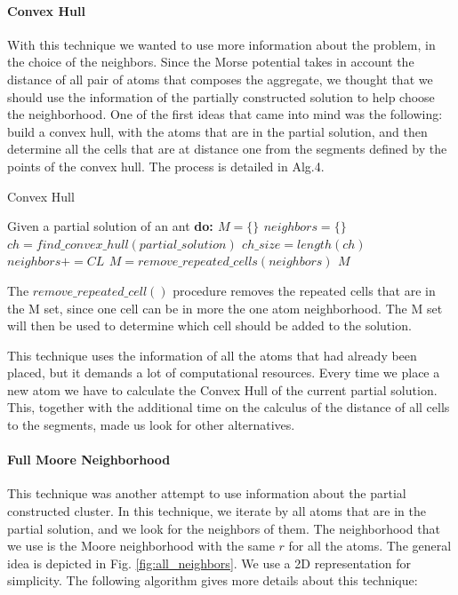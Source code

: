 			\paragraph*{Convex Hull}
			With this technique we wanted to use more information about the problem, in the choice of the neighbors. Since the Morse potential takes in account the distance of all pair of atoms that composes the aggregate, we thought that we should use the information of the partially constructed solution to help choose the neighborhood. One of the first ideas that came into mind was the following: build a convex hull, with the atoms that are in the partial solution, and then determine all the cells that are at distance one from the segments defined by the points of the convex hull. The process is detailed in Alg.4.
			\begin{algorithm}
				\caption{Convex Hull}
				\label{alg:convex_hull}
				\begin{algorithmic}
				\STATE Given a partial solution of an ant \bf{do}:
				\STATE $M = \{\}$
				\STATE $neighbors = \{\}$
				\STATE $ch = find\_convex\_hull(partial\_solution)$
				\STATE $ch\_size = length(ch)$
							\STATE $neighbors += CL$
						\ENDIF
					\ENDFOR
				\ENDFOR
				\STATE $M = remove\_repeated\_cells(neighbors)$
				\RETURN $M$
				\end{algorithmic}
			\end{algorithm}
			
			The $remove\_repeated\_cell()$ procedure removes the repeated cells that are in the M set, since one cell can be in more the one atom neighborhood.
			The M set will then be used to determine which cell should be added to the solution.

			This technique uses the information of all the atoms that had already been placed, but it demands a lot of computational resources. Every time we place a new atom we have to calculate the Convex Hull of the current partial solution. This, together with the additional time on the calculus of the distance of all cells to the segments, made us look for other alternatives.
			
			\paragraph*{Full Moore Neighborhood}
			This technique was another attempt to use information about the partial constructed cluster.  In this technique, we iterate by all atoms that are in the partial solution, and we look for the neighbors of them. The neighborhood that we use is the Moore neighborhood with the same $r$ for all the atoms. The general idea is depicted in Fig. \ref{fig:all_neighbors}. We use a 2D representation for simplicity. The following algorithm gives more details about this technique:
		
